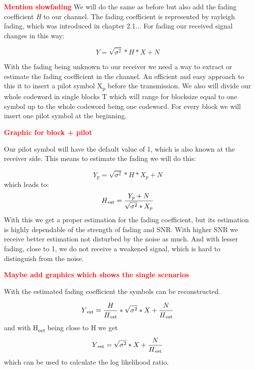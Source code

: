 \documentclass[12pt,oneside, draft]{report}
\newcommand\boldred[1]{\textcolor{red}{\textbf{#1}}}
\begin{document}
\boldred{Mention slowfading}
We will do the same as before but also add the fading coefficient \textit{H} to our channel. The fading coefficient is represented by rayleigh fading, which was introduced in chapter 2.1... For fading our received signal changes in this way:

\begin{equation}
\label{eq:fading}
Y= \sqrt{\sigma^2}*H*X + N
\end{equation}

With the fading being unknown to our receiver we need a way to extract or estimate the fading coefficient in the channel. An efficient and easy approach to this it to insert a pilot symbol X\textsubscript{p} before the transmission. We also will divide our whole codeword in single blocks T which will range for blocksize equal to one symbol up to the whole codeword being one codeword. For every block we will insert one pilot symbol at the beginning.

\boldred{Graphic for block + pilot}

Our pilot symbol will have the default value of 1, which is also known at the receiver side. This means to estimate the fading we will do this:

\begin{equation}
\label{eq:fadest}
Y_p = \sqrt{\sigma^2}*H*X_p + N
\end{equation}
which leads to:
\begin{equation}
H\textsubscript{est} = \frac{Y_p + N}{\sqrt{\sigma^2} * X_p}
\end{equation}
With this we get a proper estimation for the fading coefficient, but its estimation is highly dependable of the strength of fading and SNR. With higher SNR we receive better estimation not disturbed by the noise as much. And with lesser fading, close to 1, we do not receive a weakened signal, which is hard to distinguish from the noise. 

\boldred{Maybe add graphics which shows the single scenarios}

With the estimated fading coefficient the symbols can be reconstructed.

\begin{equation}
Y\textsubscript{est} = \frac{H}{H\textsubscript{est}}*\sqrt{\sigma^2}*X + \frac{N}{H\textsubscript{est}}
\end{equation}
and with H\textsubscript{est} being close to H we get
\begin{equation}
Y\textsubscript{est} = \sqrt{\sigma^2}*X + \frac{N}{H\textsubscript{est}}
\end{equation}
which can be used to calculate the log likelihood ratio.
\end{document}
